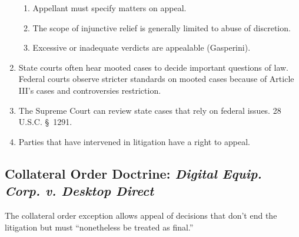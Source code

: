 \begin{enumerate}
\begin{enumerate}
        \item Appellant must specify matters on appeal.
        \item The scope of injunctive relief is generally limited to abuse of 
        discretion.
        \item Excessive or inadequate verdicts are appealable (Gasperini).
    \end{enumerate}
    \item State courts often hear mooted cases to decide important questions 
    of law. Federal courts observe stricter standards on mooted cases because 
    of Article III's cases and controversies restriction.
    \item The Supreme Court can review state cases that rely on federal 
    issues. 28 U.S.C. \S\ 1291.
    \item Parties that have intervened in litigation have a right to appeal.
\end{enumerate}

\subsection{Collateral Order Doctrine: \emph{Digital Equip. Corp. v. Desktop 
Direct}}

The collateral order exception allows appeal of decisions that don't end the 
litigation but must ``nonetheless be treated as final.''

